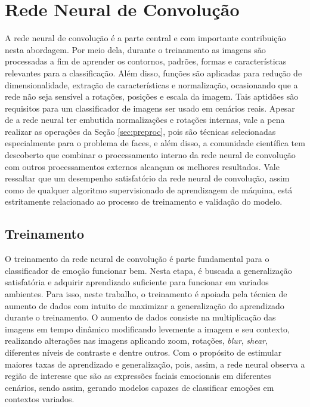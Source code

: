 \section{Rede Neural de Convolução}\label{sec:redeneu}
A rede neural de convolução é a parte central e com importante contribuição nesta abordagem. Por meio dela, durante o treinamento as imagens são processadas a fim de aprender os contornos, padrões, formas e características relevantes para a classificação. Além disso, funções são aplicadas para redução de dimensionalidade, extração de características e normalização, ocasionando que a rede não seja sensível a rotações, posições e escala da imagem. Tais aptidões são requisitos para um classificador de imagens ser usado em cenários reais. Apesar de a rede neural ter embutida normalizações e rotações internas, vale a pena realizar as operações da Seção \ref{sec:preproc}, pois são técnicas selecionadas especialmente para o problema de faces, e além disso, a comunidade científica tem descoberto que combinar o processamento interno da rede neural de convolução com outros processamentos externos alcançam os melhores resultados. Vale ressaltar que um desempenho satisfatório da rede neural de convolução, assim como de qualquer algoritmo supervisionado de aprendizagem de máquina, está estritamente relacionado ao processo de treinamento e validação do modelo.    

\subsection{Treinamento}
O treinamento da rede neural de convolução é parte fundamental para o classificador de emoção funcionar bem. Nesta etapa, é buscada a generalização satisfatória e adquirir aprendizado suficiente para funcionar em variados ambientes. Para isso, neste trabalho, o treinamento é apoiada pela técnica de aumento de dados com intuito de maximizar a generalização do aprendizado durante o treinamento. O aumento de dados consiste na multiplicação das imagens em tempo dinâmico modificando levemente a imagem e seu contexto, realizando alterações nas imagens aplicando zoom, rotações, \textit{blur}, \textit{shear}, diferentes níveis de contraste e dentre outros. Com o propósito de estimular maiores taxas de aprendizado e generalização, pois, assim, a rede neural observa a região de interesse que são as expressões faciais emocionais em diferentes cenários, sendo assim, gerando modelos capazes de classificar emoções em contextos variados. 

